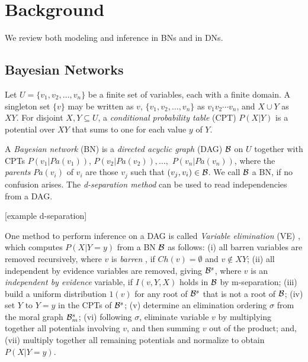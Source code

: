 %
\chapter{Background}
\label{sec:background}


We review both modeling and inference in BNs and in DNs.

\section{Bayesian Networks}
\label{sec:baysian_networks}

Let $U = \{ v_1, v_2, \ldots , v_n \}$ be a finite set of variables, each with a finite domain.
A singleton set $\{v\}$ may be written as $v$, $\{ v_1, v_2, \ldots, v_n \}$ as $v_1 v_2 \cdots v_n$, and $X \cup Y$ as $XY$.
For disjoint $X,Y \subseteq U$, a \emph{conditional probability table} (CPT) $P(X|Y)$ is a potential over $XY$ that sums to one for each value $y$ of $Y$.

A \emph{Bayesian network} (BN) \cite{pear88} is a \emph{directed acyclic graph} (DAG) $\cal{B}$ on $U$ together with CPTs $P(v_1 | Pa(v_1))$, $P(v_2|Pa(v_2)),$$\ldots,$ $P(v_n|Pa(v_n))$, where the \emph{parents} $Pa(v_i)$ of $v_i$ are those $v_j$ such that $(v_j,v_i) \in \cal{B}$.
We call $\cal{B}$ a BN, if no confusion arises.
The \emph{d-separation method} \cite{pear88} can be used to read independencies from a DAG. 

[example d-separation]


One method to perform inference on a DAG is called \emph{Variable elimination} (VE) \cite{zhan94}, which computes $P(X|Y=y)$ from a BN $\cal{B}$ as follows:
(i) all barren variables are removed recursively, where $v$ is \emph{barren} \cite{zhan94}, if $Ch(v) = \emptyset$ and $v \not\in XY$;
(ii) all independent by evidence variables are removed, giving ${\cal{B}}^s$, where $v$ is an \emph{independent by evidence} variable, if $I(v,Y,X)$ holds in $\cal{B}$ by m-separation;
(iii) build a uniform distribution $1(v)$ for any root of ${\cal{B}}^s$ that is not a root of $\cal{B}$;
(iv) set $Y$ to $Y=y$ in the CPTs of ${\cal{B}}^s$;
(v) determine an elimination ordering $\sigma$ from the moral graph ${\cal{B}}^{s}_{m}$;
(vi) following $\sigma$, eliminate variable $v$ by multiplying together all potentials involving $v$, and then summing $v$ out of the product;
and, (vii) multiply together all remaining potentials and normalize to obtain $P(X|Y=y)$.

